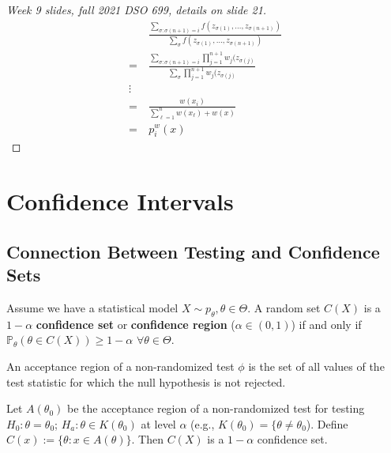 \begin{proof}[Week 9 slides, fall 2021 DSO 699, details on slide 21]
\begin{align*}
& \frac{\sum_{\sigma: \sigma(n+1) = i} f(z_{\sigma(1)}, \ldots, z_{\sigma(n+1)})}{\sum_{\sigma} f(z_{\sigma(1)}, \ldots, z_{\sigma(n+1)})}
\\ = ~ & \frac{\sum_{\sigma: \sigma(n+1) = i} \prod_{j=1}^{n+1} w_j(z_{\sigma(j)}}{\sum_{\sigma}  \prod_{j=1}^{n+1} w_j(z_{\sigma(j)}}
\\ \vdots
\\ = ~ & \frac{w(x_i)}{\sum_{\ell = 1}^n w(x_\ell) + w(x)}
\\ = ~ & p_i^w(x)
\end{align*}

\end{proof}


%
%
%
%
%
%
%


\section{Confidence Intervals}

\subsection{Connection Between Testing and Confidence Sets}

\begin{definition}

Assume we have a statistical model \(X \sim p_\theta, \theta \in \Theta\). A random set \(C(X)\) is a \(1 - \alpha\) \textbf{confidence set} or \textbf{confidence region} (\(\alpha \in (0,1)\)) if and only if \(\mathbb{P}_\theta (\theta \in C(X)) \geq 1 - \alpha\) \( \forall \theta \in \Theta \).

\end{definition}

\begin{remark}

An acceptance region of a non-randomized test \(\phi\) is the set of all values of the test statistic for which the null hypothesis is not rejected.

\end{remark}

\begin{theorem}

Let \(A(\theta_0)\) be the acceptance region of a non-randomized test for testing \(H_0: \theta = \theta_0\); \(H_a: \theta \in K(\theta_0)\) at level \(\alpha\) (e.g., \(K(\theta_0) = \{ \theta \neq \theta_0\)). Define \(C(x) := \{\theta: x \in A(\theta) \}\). Then \(C(X)\) is a \(1 - \alpha\) confidence set.

\end{theorem}

